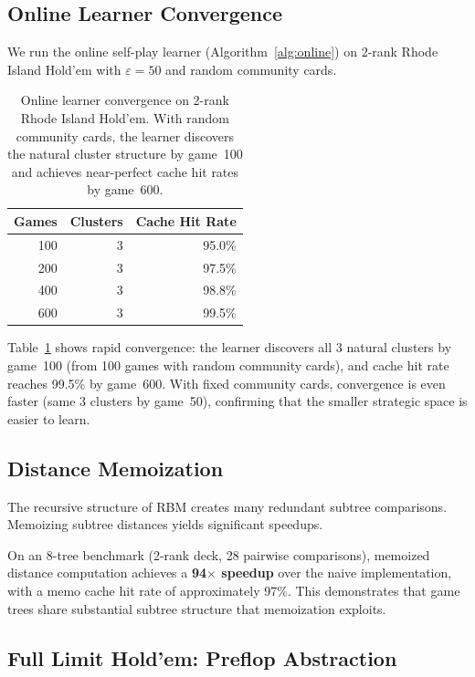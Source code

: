 \documentclass[11pt]{article}
\begin{document}
\subsection{Online Learner Convergence}

We run the online self-play learner (Algorithm~\ref{alg:online}) on
2-rank Rhode Island Hold'em with $\varepsilon = 50$ and random community
cards.

\begin{table}[t]
\centering
\caption{Online learner convergence on 2-rank Rhode Island Hold'em.
With random community cards, the learner discovers the natural cluster
structure by game~100 and achieves near-perfect cache hit rates by
game~600.}
\label{tab:online}
\begin{tabular}{rrr}
\toprule
Games & Clusters & Cache Hit Rate \\
\midrule
100 & 3 & 95.0\% \\
200 & 3 & 97.5\% \\
400 & 3 & 98.8\% \\
600 & 3 & 99.5\% \\
\bottomrule
\end{tabular}
\end{table}

Table~\ref{tab:online} shows rapid convergence: the learner discovers
all 3 natural clusters by game~100 (from 100 games with random
community cards), and cache hit rate reaches 99.5\% by game~600. With
fixed community cards, convergence is even faster (same 3 clusters by
game~50), confirming that the smaller strategic space is easier to
learn.

\subsection{Distance Memoization}

The recursive structure of RBM creates many redundant subtree
comparisons. Memoizing subtree distances yields significant speedups.

On an 8-tree benchmark (2-rank deck, 28 pairwise comparisons), memoized
distance computation achieves a \textbf{94$\times$ speedup} over the
naive implementation, with a memo cache hit rate of approximately 97\%.
This demonstrates that game trees share substantial subtree structure
that memoization exploits.

\subsection{Full Limit Hold'em: Preflop Abstraction}
\label{sec:experiments-limit}
\end{document}

